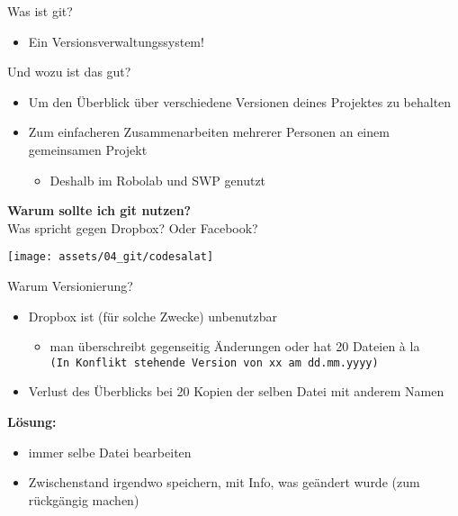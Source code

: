 \begin{frame}
	\centering \Huge \alert{Was ist git?}\\[.7cm]
	\normalsize
	\begin{itemize}
		\item Ein Versionsverwaltungssystem!
	\end{itemize}
	\centering \Huge \alert{Und wozu ist das gut?}\\[.7cm]
	\normalsize
	\begin{itemize}
		\item Um den Überblick über verschiedene Versionen deines Projektes zu behalten
		\item Zum einfacheren Zusammenarbeiten mehrerer Personen an einem gemeinsamen Projekt
		\begin{itemize}
			\item Deshalb im Robolab und SWP genutzt
		\end{itemize}
	\end{itemize}
\end{frame}

\begin{frame}
	\centering \Huge \textbf{Warum sollte ich git nutzen?} \\[.7cm]

	\normalsize Was spricht gegen Dropbox? Oder Facebook?
\end{frame}

\begin{frame}
	\centering \texttt{[image: assets/04\_git/codesalat]}

\end{frame}

\begin{frame}{Warum Versionierung?}
	\begin{itemize}
		\item Dropbox ist (für solche Zwecke) unbenutzbar
		\begin{itemize}
			\item man überschreibt gegenseitig Änderungen oder hat 20 Dateien à la \\
				\centering \texttt{(In Konflikt stehende Version von xx am dd.mm.yyyy)}
		\end{itemize}
		\item \flushleft Verlust des Überblicks bei 20 Kopien der selben Datei mit anderem Namen
	\end{itemize}
	\pause{}
	\vfill
	\textbf{\alert{Lösung:}}
	\begin{itemize}
		\item immer selbe Datei bearbeiten
		\item Zwischenstand irgendwo speichern, mit Info, was geändert wurde (zum rückgängig machen)
	\end{itemize}
\end{frame}

